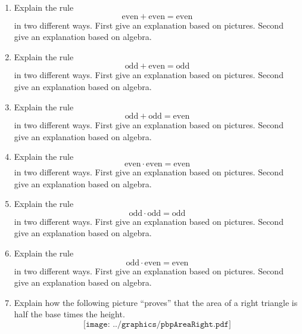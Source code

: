 \begin{problems}
\begin{enumerate}
\item Explain the rule
\[
\text{even} + \text{even} = \text{even}
\]
in two different ways. First give an explanation based on
pictures. Second give an explanation based on algebra. 
\item Explain the rule
\[
\text{odd} + \text{even} = \text{odd}
\]
in two different ways. First give an explanation based on
pictures. Second give an explanation based on algebra.
\item Explain the rule
\[
\text{odd} + \text{odd} = \text{even}
\]
in two different ways. First give an explanation based on
pictures. Second give an explanation based on algebra.
\item Explain the rule
\[
\text{even} \cdot \text{even} = \text{even}
\]
in two different ways. First give an explanation based on
pictures. Second give an explanation based on algebra.
\item Explain the rule
\[
\text{odd} \cdot \text{odd} = \text{odd}
\]
in two different ways. First give an explanation based on
pictures. Second give an explanation based on algebra.
\item Explain the rule
\[
\text{odd} \cdot \text{even} = \text{even}
\]
in two different ways. First give an explanation based on
pictures. Second give an explanation based on algebra.
\item\label{P:RTA} Explain how the following picture ``proves'' that
  the area of a right triangle is half the base times the height.
\[
\texttt{[image: ../graphics/pbpAreaRight.pdf]}
\]


\end{enumerate}
\end{problems}
